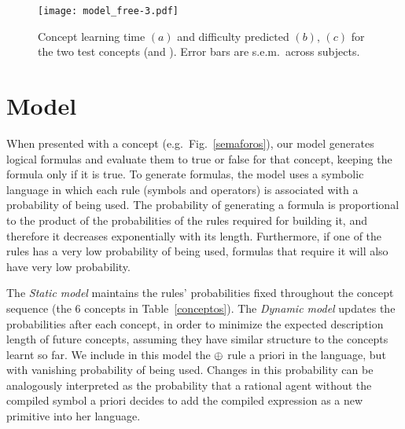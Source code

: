 \begin{figure}[t!]
      \texttt{[image: model\_free-3.pdf]}
      \centering
      \caption{Concept learning time $(a)$ and difficulty predicted $(b)$, $(c)$ for the two test concepts (\testa and \testb). Error bars are s.e.m.\ across subjects.}
      \label{model free}
   \end{figure}
   
\section{Model}

When presented with a concept (e.g.~Fig.~\ref{semaforos}), our model generates logical formulas and evaluate them to true or false for that concept, keeping the formula only if it is true. To generate formulas, the model uses a symbolic language in which each rule (symbols and operators) is associated with a probability of being used. The probability of generating a formula is proportional to the product of the probabilities of the rules required for building it, and therefore it decreases exponentially with its length. Furthermore, if one of the rules has a very low probability of being used, formulas that require it will also have very low probability.

The \textit{Static model} maintains the rules' probabilities fixed throughout the concept sequence (the 6 concepts in Table~\ref{conceptos}). The \textit{Dynamic model} updates the probabilities after each concept, in order to minimize the expected description length of future concepts, assuming they have similar structure to the concepts learnt so far. We include in this model the $\oplus$ rule a priori in the language, but with vanishing probability of being used. Changes in this probability can be analogously interpreted as the probability that a rational agent without the compiled symbol a priori decides to add the compiled expression as a new primitive into her language. %


